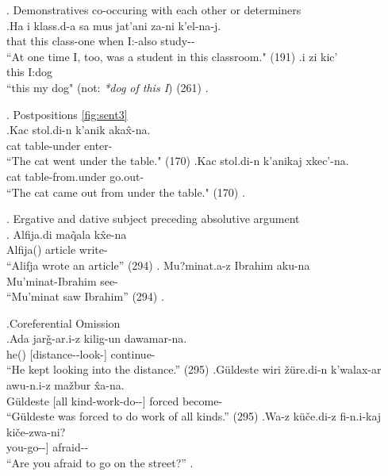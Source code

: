     
\ex. Demonstratives co-occuring with each other or determiners \\
    \ag.\label{sent:ex6a}Ha i klass.d-a sa mus jat'ani za-ni k'el-na-j. \\
    that this class-\Inessc[] one when \Indf[] I:\Erg[]-also study-\Aori[]-\Pst[] \\
    ``At one time I, too, was a student in this classroom." (191)
    \bg.\label{sent:ex6b}i zi kic' \\
    this I:\Gen[] dog \\
    ``this my dog" (not: \textit{*dog of this I}) (261)
    \z.

\ex. \label{sent:ex3}Postpositions \ref{fig:sent3}\\
    \ag.\label{sent:ex3a}Kac stol.di-n k'anik aka\^{x}-na. \\
        cat table-\Gen[] under enter-\Aori[] \\
        ``The cat went under the table." (170) 
    \bg.\label{sent:ex3b}Kac stol.di-n k'anikaj xkec'-na. \\
        cat table-\Gen[] from.under go.out-\Aori[] \\
        ``The cat came out from under the table." (170)
    \z.

\ex.\label{sent:ex5} Ergative and dative subject preceding absolutive argument \\
    \ag. Alfija.di ma\~{q}ala k\^{x}e-na \\
        Alfija(\Erg[]) article write-\Aori[] \\
        ``Alifja wrote an article'' (294)
    \bg. Mu?minat.a-z Ibrahim aku-na \\
        Mu'minat-\Dat[] Ibrahim see-\Aori \\
        ``Mu'minat saw Ibrahim'' (294)
    \z.

\ex.\label{sent:ex8}Coreferential Omission \\
    \ag.\label{sent:ex8a}Ada jar\v{g}-ar.i-z kilig-un dawamar-na. \\
    he(\Erg[]) [distance-\Pl[]-\Dat[] look-\Masd[]] continue-\Aori[] \\
    ``He kept looking into the distance.'' (295)
    \bg.\label{sent:ex8b}G\"{u}ldeste wiri \v{z}\"{u}re.di-n k'walax-ar awu-n.i-z ma\v{z}bur \^{x}a-na. \\
    G\"{u}ldeste [all kind-\Gen[] work-\Pl[] do-\Masd[]-\Dat[]] forced become-\Aori[] \\
    ``G\"{u}ldeste was forced to do work of all kinds.'' (295)
    \cg.\label{sent:ex8c}Wa-z k\"{u}\v{c}e.di-z fi-n.i-kaj ki\v{c}e-zwa-ni? \\
    you-\Dat[] [street-\Dat[] go-\Masd[]-\Sbelc[]] afraid-\Impf[]-\Q[] \\
    ``Are you afraid to go on the street?''
    \z.

